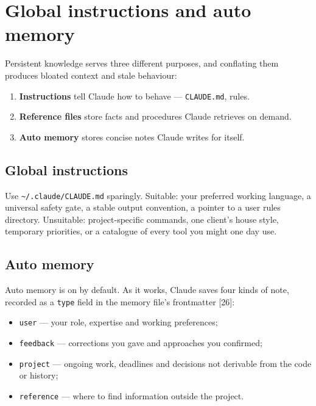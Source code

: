 \documentclass[11pt,a4paper,twoside,openany]{book}
\newcommand{\chaptertitlelabel}{}
\begin{document}
\FloatBarrier
\renewcommand{\chaptertitlelabel}{Part III \textperiodcentered\ Chapter 10}
\setcounter{chapter}{9}
\chapter{Global instructions and auto memory}

Persistent knowledge serves three different purposes, and conflating them produces bloated context and stale behaviour:


\begin{enumerate}
\item \textbf{Instructions} tell Claude how to behave — \texttt{CLAUDE.\allowbreak{}md}, rules.
\item \textbf{Reference files} store facts and procedures Claude retrieves on demand.
\item \textbf{Auto memory} stores concise notes Claude writes for itself.
\end{enumerate}

\FloatBarrier
\setcounter{section}{0}
\section{Global instructions}

Use \texttt{\textasciitilde{}/\allowbreak{}.\allowbreak{}claude/\allowbreak{}CLAUDE.\allowbreak{}md} sparingly. Suitable: your preferred working language, a universal safety gate, a stable output convention, a pointer to a user rules directory. Unsuitable: project-specific commands, one client's house style, temporary priorities, or a catalogue of every tool you might one day use.


\FloatBarrier
\setcounter{section}{1}
\section{Auto memory}

Auto memory is on by default. As it works, Claude saves four kinds of note, recorded as a \texttt{type} field in the memory file's frontmatter [26]:


\begin{itemize}
\item \texttt{user} — your role, expertise and working preferences;
\item \texttt{feedback} — corrections you gave and approaches you confirmed;
\item \texttt{project} — ongoing work, deadlines and decisions not derivable from the code or history;
\item \texttt{reference} — where to find information outside the project.
\end{itemize}
\end{document}
